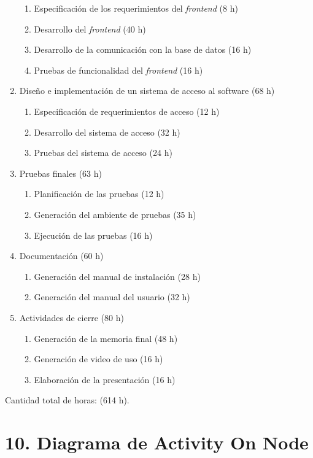 \documentclass[
11pt, %
]{charter}
\begin{document}
\begin{enumerate}
\begin{enumerate}
	\item Especificación de los requerimientos del \textit{frontend} (8 h)
	\item Desarrollo del \textit{frontend} (40 h)
	\item Desarrollo de la comunicación con la base de datos (16 h)
	\item Pruebas de funcionalidad del \textit{frontend} (16 h) 
	\end{enumerate}
\item Diseño e implementación de un sistema de acceso al software (68 h)
	\begin{enumerate}
	\item Especificación de requerimientos de acceso (12 h)
	\item Desarrollo del sistema de acceso (32 h)
	\item Pruebas del sistema de acceso (24 h) 
	\end{enumerate}		
\item Pruebas finales (63 h)
	\begin{enumerate}
	\item Planificación de las pruebas (12 h) 
	\item Generación del ambiente de pruebas (35 h)
	\item Ejecución de las pruebas (16 h)
	\end{enumerate}
\item Documentación (60 h)
	\begin{enumerate}
	\item Generación del manual de instalación (28 h)
	\item Generación del manual del usuario (32 h)
	\end{enumerate}
\item Actividades de cierre (80 h)
	\begin{enumerate}
	\item Generación de la memoria final (48 h)
	\item Generación de video de uso (16 h)
	\item Elaboración de la presentación (16 h) 
	\end{enumerate}
\end{enumerate}

Cantidad total de horas: (614 h).

\section{10. Diagrama de Activity On Node}
\label{sec:AoN}
\end{document}

